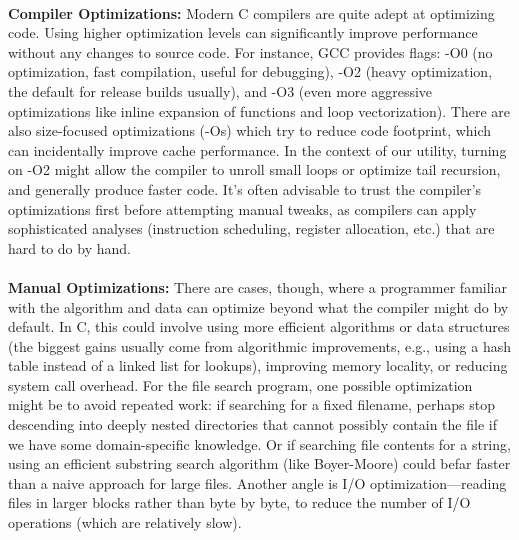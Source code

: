 \documentclass{article}
\begin{document}
\\
{\normalsize \textbf{Compiler Optimizations}}{\normalsize \textbf{:}}  {\normalsize Modern C compilers are quite adept at optimizing code. Using higher optimization levels can significantly improve performance without any changes to source code. For instance, GCC provides flags: -O0 (no optimiza}{\normalsize tion, fast compilation, useful for debugging), -O2 (heavy optimization, the default for release builds usually), and -O3 (even more aggressive optimizations like inline expansion of functions and loop vectorization). There are also size-focused optimizatio}{\normalsize ns (-}{\normalsize Os}{\normalsize ) which try to reduce code footprint, which can incidentally improve cache performance. In the context of our utility, turning on -O2 might allow the compiler to unroll small loops or optimize tail recursion, and generally produce faster code. It's }{\normalsize often advisable to trust the compiler's optimizations first before attempting manual tweaks, as compilers can apply sophisticated analyses (instruction scheduling, register allocation, etc.) that are hard to do by hand.}\\
\\
{\normalsize \textbf{Manual Optimizations}}{\normalsize \textbf{:}}  {\normalsize There are ca}{\normalsize ses, though, where a programmer familiar with the algorithm and data can optimize beyond what the compiler might do by default. In C, this could involve using more efficient algorithms or data structures (the biggest gains usually come from algorithmic imp}{\normalsize rovements, e.g., using a hash table instead of a linked list for lookups), improving memory locality, or reducing system call overhead. For the file search program, one possible optimization might be to avoid repeated work: if searching for a fixed filenam}{\normalsize e, perhaps stop descending into deeply nested directories that cannot possibly }{\normalsize contain the file if we have some domain-specific knowledge. Or if searching file contents for a string, using an efficient substring search algorithm (like Boyer-Moore) could be}{\normalsize  far faster than a naive approach for large files. Another angle is I/O optimization—reading files in larger blocks rather than byte by byte, to reduce the number of I/O operations (which are relatively slow).}\\
\\
\end{document}
